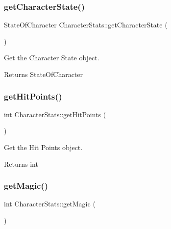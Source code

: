 \subsubsection{\texorpdfstring{getCharacterState()}{getCharacterState()}}
{\footnotesize\ttfamily State\+Of\+Character Character\+Stats\+::get\+Character\+State (\begin{DoxyParamCaption}{ }\end{DoxyParamCaption})\hspace{0.3cm}{\ttfamily [inline]}}



Get the Character State object. 

\begin{DoxyReturn}{Returns}
State\+Of\+Character 
\end{DoxyReturn}
\mbox{\label{classCharacterStats_a9b22b4a1fcafe1a16f3883547eb5d9bc}} 
\subsubsection{\texorpdfstring{getHitPoints()}{getHitPoints()}}
{\footnotesize\ttfamily int Character\+Stats\+::get\+Hit\+Points (\begin{DoxyParamCaption}{ }\end{DoxyParamCaption})\hspace{0.3cm}{\ttfamily [inline]}}



Get the Hit Points object. 

\begin{DoxyReturn}{Returns}
int 
\end{DoxyReturn}
\mbox{\label{classCharacterStats_a96f79ff2af072daba294d8e04f9d29a4}} 
\subsubsection{\texorpdfstring{getMagic()}{getMagic()}}
{\footnotesize\ttfamily int Character\+Stats\+::get\+Magic (\begin{DoxyParamCaption}{ }\end{DoxyParamCaption})\hspace{0.3cm}{\ttfamily [inline]}}



